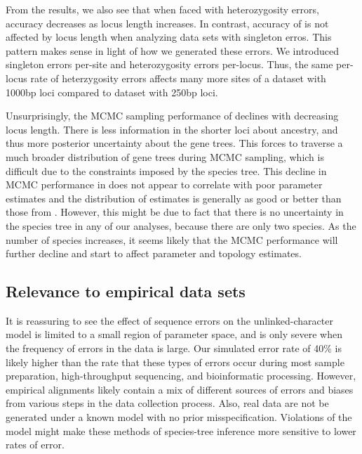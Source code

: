 From the \ecoevolity results,
we also see that when faced with heterozygosity errors,
accuracy decreases as locus length increases.
In contrast, accuracy of \ecoevolity is not affected by locus
length when analyzing data sets with singleton erros.
This pattern makes sense in light of how we generated these errors.
We introduced singleton errors per-site and heterozygosity errors per-locus.
Thus, the same per-locus rate of heterzygosity errors affects many more sites
of a dataset with 1000bp loci compared to dataset with 250bp loci.

Unsurprisingly, the MCMC sampling performance of \beast declines with
decreasing locus length.
There is less information in the shorter loci about ancestry, and thus more
posterior uncertainty about the gene trees.
This forces \beast to traverse a much broader distribution of gene trees during
MCMC sampling, which is difficult due to the constraints imposed by the
species tree.
This decline in MCMC performance in \beast does not appear to correlate with
poor parameter estimates and the distribution of estimates is generally as good
or better than those from \ecoevolity. 
However, this might be due to fact that there is no uncertainty in the species
tree in any of our analyses, because there are only two species.
As the number of species increases, it seems likely that the MCMC performance
will further decline and start to affect parameter and topology estimates.


\subsection{Relevance to empirical data sets}
It is reassuring to see the effect of sequence errors on the unlinked-character
model is limited to a small region of parameter space, and is only severe when
the frequency of errors in the data is large.
Our simulated error rate of 40\% is likely higher than the rate that these
types of errors occur during most sample preparation, high-throughput sequencing,
and bioinformatic processing.
However, empirical alignments likely contain a mix of different sources of
errors and biases from various steps in the data collection process.
Also, real data are not be generated under a known model with no prior
misspecification.
Violations of the model might make these methods of species-tree inference more
sensitive to lower rates of error.

